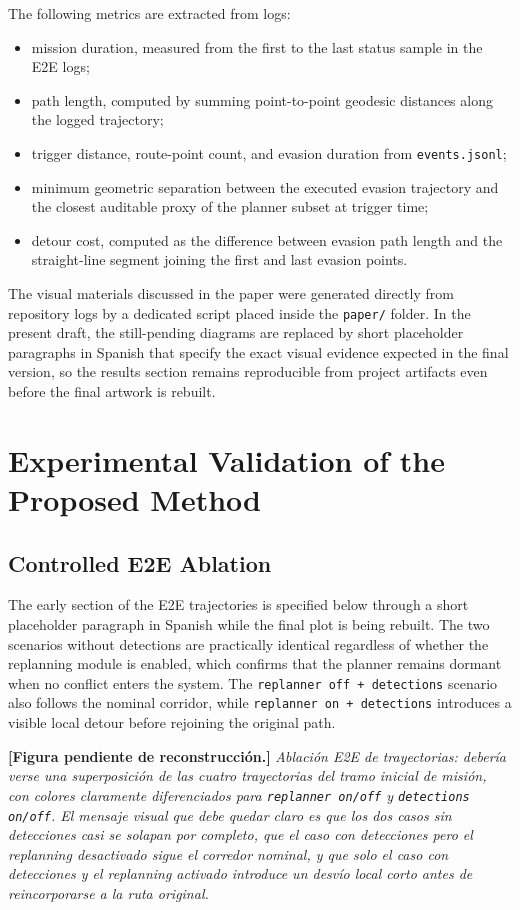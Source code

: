\documentclass[a4paper,11pt]{article}
\newcommand{\diagramplaceholder}[1]{\par\smallskip\noindent\textbf{[Figura pendiente de reconstrucción.] } \emph{#1}\par\smallskip}
\begin{document}
The following metrics are extracted from logs:
\begin{itemize}[leftmargin=1.3em]
    \item mission duration, measured from the first to the last status sample in the E2E logs;
    \item path length, computed by summing point-to-point geodesic distances along the logged trajectory;
    \item trigger distance, route-point count, and evasion duration from \texttt{events.jsonl};
    \item minimum geometric separation between the executed evasion trajectory and the closest auditable proxy of the planner subset at trigger time;
    \item detour cost, computed as the difference between evasion path length and the straight-line segment joining the first and last evasion points.
\end{itemize}

The visual materials discussed in the paper were generated directly from repository logs by a dedicated script placed inside the \texttt{paper/} folder. In the present draft, the still-pending diagrams are replaced by short placeholder paragraphs in Spanish that specify the exact visual evidence expected in the final version, so the results section remains reproducible from project artifacts even before the final artwork is rebuilt.

\section{Experimental Validation of the Proposed Method}

\subsection{Controlled E2E Ablation}

The early section of the E2E trajectories is specified below through a short placeholder paragraph in Spanish while the final plot is being rebuilt. The two scenarios without detections are practically identical regardless of whether the replanning module is enabled, which confirms that the planner remains dormant when no conflict enters the system. The \texttt{replanner off + detections} scenario also follows the nominal corridor, while \texttt{replanner on + detections} introduces a visible local detour before rejoining the original path.

\diagramplaceholder{Ablación E2E de trayectorias: debería verse una superposición de las cuatro trayectorias del tramo inicial de misión, con colores claramente diferenciados para \texttt{replanner on/off} y \texttt{detections on/off}. El mensaje visual que debe quedar claro es que los dos casos sin detecciones casi se solapan por completo, que el caso con detecciones pero el replanning desactivado sigue el corredor nominal, y que solo el caso con detecciones y el replanning activado introduce un desvío local corto antes de reincorporarse a la ruta original.}
\end{document}
